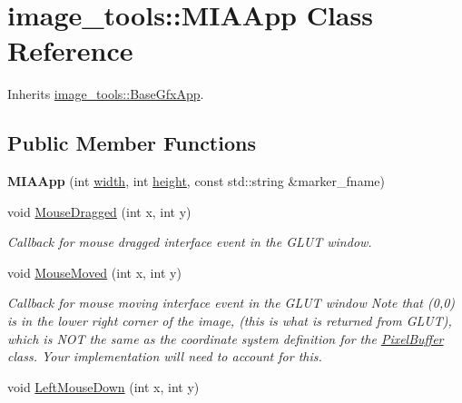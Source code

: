 \hypertarget{classimage__tools_1_1MIAApp}{}\section{image\+\_\+tools\+:\+:M\+I\+A\+App Class Reference}
\label{classimage__tools_1_1MIAApp}


Inherits \hyperlink{classimage__tools_1_1BaseGfxApp}{image\+\_\+tools\+::\+Base\+Gfx\+App}.

\subsection*{Public Member Functions}
\begin{DoxyCompactItemize}
\item 
{\bfseries M\+I\+A\+App} (int \hyperlink{classimage__tools_1_1BaseGfxApp_a2fe403c5392f624477c2ce4429f1a7b5}{width}, int \hyperlink{classimage__tools_1_1BaseGfxApp_aa961e13a7a8e6062204223cc33ac7503}{height}, const std\+::string \&marker\+\_\+fname)\hypertarget{classimage__tools_1_1MIAApp_a0fbfba996c29b82ef1c208e0ef0b802e}{}\label{classimage__tools_1_1MIAApp_a0fbfba996c29b82ef1c208e0ef0b802e}

\item 
void \hyperlink{classimage__tools_1_1MIAApp_a22de582c71210c873cde634130478158}{Mouse\+Dragged} (int x, int y)\hypertarget{classimage__tools_1_1MIAApp_a22de582c71210c873cde634130478158}{}\label{classimage__tools_1_1MIAApp_a22de582c71210c873cde634130478158}

\begin{DoxyCompactList}\small\item\em Callback for mouse dragged interface event in the G\+L\+UT window. \end{DoxyCompactList}\item 
void \hyperlink{classimage__tools_1_1MIAApp_afe0b149a45cba12ab1f93d54911caec5}{Mouse\+Moved} (int x, int y)\hypertarget{classimage__tools_1_1MIAApp_afe0b149a45cba12ab1f93d54911caec5}{}\label{classimage__tools_1_1MIAApp_afe0b149a45cba12ab1f93d54911caec5}

\begin{DoxyCompactList}\small\item\em Callback for mouse moving interface event in the G\+L\+UT window Note that (0,0) is in the lower right corner of the image, (this is what is returned from G\+L\+UT), which is N\+OT the same as the coordinate system definition for the \hyperlink{classimage__tools_1_1PixelBuffer}{Pixel\+Buffer} class. Your implementation will need to account for this. \end{DoxyCompactList}\item 
void \hyperlink{classimage__tools_1_1MIAApp_afbfdd2f2d0773e1202c4610ffb077d11}{Left\+Mouse\+Down} (int x, int y)\hypertarget{classimage__tools_1_1MIAApp_afbfdd2f2d0773e1202c4610ffb077d11}{}\label{classimage__tools_1_1MIAApp_afbfdd2f2d0773e1202c4610ffb077d11}


\end{DoxyCompactItemize}
